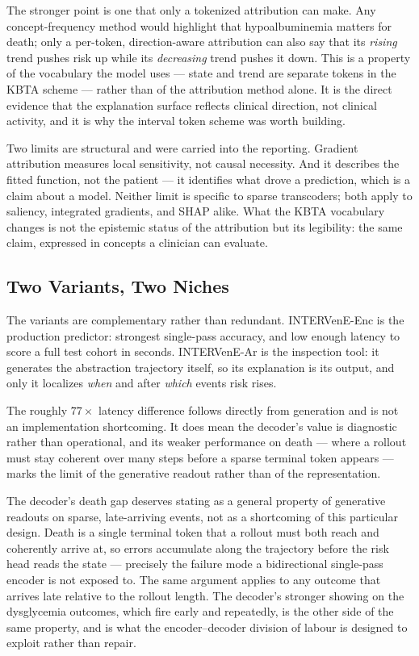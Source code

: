The stronger point is one that only a tokenized attribution can make. Any concept-frequency method would highlight that hypoalbuminemia matters for death; only a per-token, direction-aware attribution can also say that its \emph{rising} trend pushes risk up while its \emph{decreasing} trend pushes it down. This is a property of the vocabulary the model uses --- state and trend are separate tokens in the KBTA scheme --- rather than of the attribution method alone. It is the direct evidence that the explanation surface reflects clinical direction, not clinical activity, and it is why the interval token scheme was worth building.

Two limits are structural and were carried into the reporting. Gradient attribution measures local sensitivity, not causal necessity. And it describes the fitted function, not the patient --- it identifies what drove a prediction, which is a claim about a model. Neither limit is specific to sparse transcoders; both apply to saliency, integrated gradients, and SHAP alike. What the KBTA vocabulary changes is not the epistemic status of the attribution but its legibility: the same claim, expressed in concepts a clinician can evaluate.

\subsection{Two Variants, Two Niches}

The variants are complementary rather than redundant. INTERVenE-Enc is the production predictor: strongest single-pass accuracy, and low enough latency to score a full test cohort in seconds. INTERVenE-Ar is the inspection tool: it generates the abstraction trajectory itself, so its explanation is its output, and only it localizes \emph{when} and after \emph{which} events risk rises.

The roughly $77\times$ latency difference follows directly from generation and is not an implementation shortcoming. It does mean the decoder's value is diagnostic rather than operational, and its weaker performance on death --- where a rollout must stay coherent over many steps before a sparse terminal token appears --- marks the limit of the generative readout rather than of the representation.

The decoder's death gap deserves stating as a general property of generative readouts on sparse, late-arriving events, not as a shortcoming of this particular design. Death is a single terminal token that a rollout must both reach and coherently arrive at, so errors accumulate along the trajectory before the risk head reads the state --- precisely the failure mode a bidirectional single-pass encoder is not exposed to. The same argument applies to any outcome that arrives late relative to the rollout length. The decoder's stronger showing on the dysglycemia outcomes, which fire early and repeatedly, is the other side of the same property, and is what the encoder--decoder division of labour is designed to exploit rather than repair.

